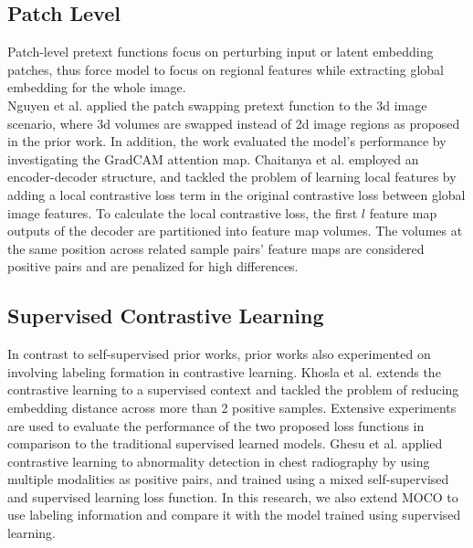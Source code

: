 \documentclass[12pt,twoside]{report}
\begin{document}
\subsection{Patch Level}

Patch-level pretext functions focus on perturbing input or latent embedding patches, thus force model to focus on regional features while extracting global embedding for the whole image. \\

Nguyen et al.\cite{selfsupervisedlearningbasedonspacial} applied the patch swapping pretext function to the 3d image scenario, where 3d volumes are swapped instead of 2d image regions as proposed in the prior work. In addition, the work evaluated the model's performance by investigating the GradCAM attention map. Chaitanya et al.\cite{contrastivelearningofglobalandlocal} employed an encoder-decoder structure, and tackled the problem of learning local features by adding a local contrastive loss term in the original contrastive loss between global image features. To calculate the local contrastive loss, the first $l$ feature map outputs of the decoder are partitioned into feature map volumes. The volumes at the same position across related sample pairs' feature maps are considered positive pairs and are penalized for high differences.

\subsection{Supervised Contrastive Learning}

In contrast to self-supervised prior works, prior works also experimented on involving labeling formation in contrastive learning. Khosla et al.\cite{supervisedContrastLearning} extends the contrastive learning to a supervised context and tackled the problem of reducing embedding distance across more than 2 positive samples. Extensive experiments are used to evaluate the performance of the two proposed loss functions in comparison to the traditional supervised learned models. Ghesu et al.\cite{selfsupervisedlearningfrom100} applied contrastive learning to abnormality detection in chest radiography by using multiple modalities as positive pairs, and trained using a mixed self-supervised and supervised learning loss function. In this research, we also extend MOCO to use labeling information and compare it with the model trained using supervised learning. 
\end{document}
